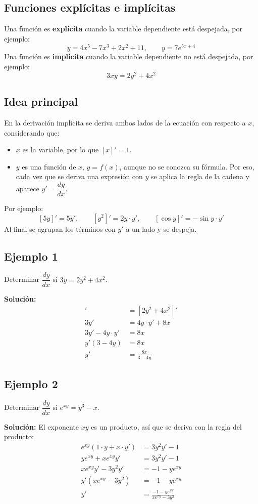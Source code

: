 \documentclass[12pt]{article}
\begin{document}
\subsection{Funciones explícitas e implícitas}

Una función es \textbf{explícita} cuando la variable dependiente está despejada, por ejemplo:
\[
y = 4x^5 - 7x^3 + 2x^2 + 11, \qquad y = 7e^{5x + 4}
\]
Una función es \textbf{implícita} cuando la variable dependiente no está despejada, por ejemplo:
\[
3xy = 2y^2 + 4x^2
\]

\subsection{Idea principal}

En la derivación implícita se deriva ambos lados de la ecuación con respecto a $x$, considerando que:
\begin{itemize}
    \item $x$ es la variable, por lo que $[x]' = 1$.
    \item $y$ es una función de $x$, $y = f(x)$, aunque no se conozca su fórmula. Por eso, cada vez que se deriva una expresión con $y$ se aplica la regla de la cadena y aparece $y' = \dfrac{dy}{dx}$.
\end{itemize}
Por ejemplo:
\[
[5y]' = 5y', \qquad [y^2]' = 2y \cdot y', \qquad [\cos y]' = -\sin y \cdot y'
\]
Al final se agrupan los términos con $y'$ a un lado y se despeja.

\subsection{Ejemplo 1}
Determinar $\dfrac{dy}{dx}$ si $3y = 2y^2 + 4x^2$.

\textbf{Solución:}
\begin{align*}
[3y]' &= [2y^2 + 4x^2]' \\
3y' &= 4y \cdot y' + 8x \\
3y' - 4y \cdot y' &= 8x \\
y'(3 - 4y) &= 8x \\
y' &= \frac{8x}{3 - 4y}
\end{align*}

\subsection{Ejemplo 2}
Determinar $\dfrac{dy}{dx}$ si $e^{xy} = y^3 - x$.

\textbf{Solución:} El exponente $xy$ es un producto, así que se deriva con la regla del producto:
\begin{align*}
e^{xy}(1 \cdot y + x \cdot y') &= 3y^2 y' - 1 \\
y e^{xy} + x e^{xy} y' &= 3y^2 y' - 1 \\
x e^{xy} y' - 3y^2 y' &= -1 - y e^{xy} \\
y'\left(x e^{xy} - 3y^2\right) &= -1 - y e^{xy} \\
y' &= \frac{-1 - y e^{xy}}{x e^{xy} - 3y^2}
\end{align*}
\end{document}
